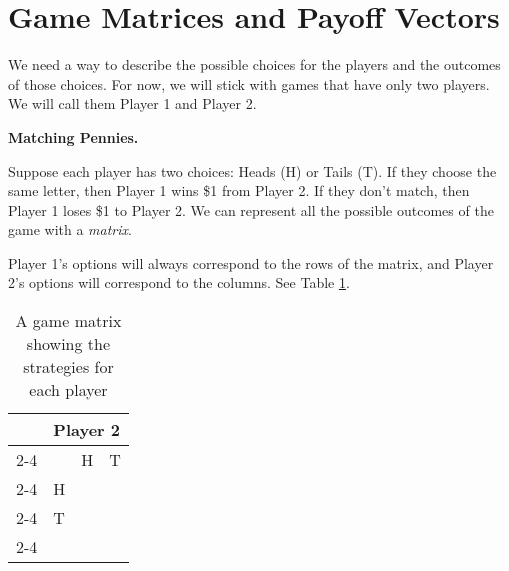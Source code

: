 \section{Game Matrices and Payoff Vectors}


\vspace{.2in}

We need a way to describe the possible choices for the players and the outcomes of those choices.
For now, we will stick with games that have only two players. We will call them Player 1 and Player 2.

\begin{example}\label{Ex:MatchPennies}\textbf{Matching Pennies.}

Suppose each player has two choices: Heads (H) or Tails (T). If they choose the same letter, then Player 1 wins \$1 from Player 2. If they don't match, then Player 1 loses \$1 to Player 2. We can represent all the possible outcomes of the game with a \emph{matrix}.  

Player 1's options will always correspond to the rows of the matrix, and Player 2's options will correspond to the columns. See Table \ref{T:template}.


\begin{table}[h]
\centering

\begin{tabular}{llll}
                      & \multicolumn{3}{l}{Player 2}                                                  \\ \cline{2-4} 
\multicolumn{1}{l|}{} & \multicolumn{1}{l|}{} & \multicolumn{1}{l|}{H} & \multicolumn{1}{l|}{T} \\ \cline{2-4} 
\multicolumn{1}{l|}{Player 1} & \multicolumn{1}{l|}{H} & \multicolumn{1}{l|}{} & \multicolumn{1}{l|}{} \\ \cline{2-4} 
\multicolumn{1}{l|}{} & \multicolumn{1}{l|}{T} & \multicolumn{1}{l|}{} & \multicolumn{1}{l|}{} \\ \cline{2-4} 
\end{tabular}
\caption{A game matrix showing the strategies for each player}
\label{T:template}
\end{table}\medskip


\end{example}
